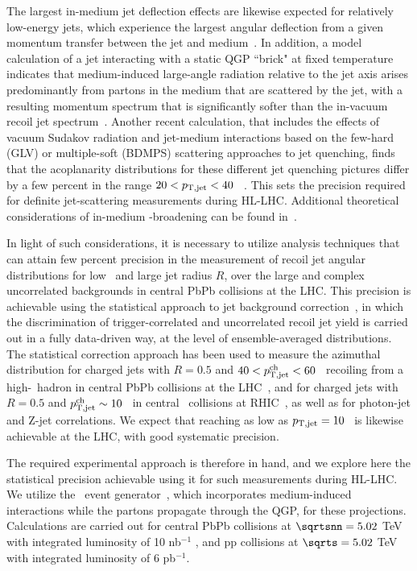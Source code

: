 The largest in-medium jet deflection effects are likewise expected for relatively low-energy jets, which experience the largest angular deflection from a given momentum transfer between the jet and medium~\cite{DEramo:2018eoy,Gyulassy:2018qhr}. In addition, a model calculation of a jet interacting with a static QGP ``brick" at fixed temperature indicates that medium-induced large-angle radiation relative to the jet axis arises predominantly from partons in the medium that are scattered by the jet, with a resulting momentum spectrum that is significantly softer than the in-vacuum recoil jet spectrum~\cite{DEramo:2018eoy}. Another recent calculation, that includes the effects of vacuum Sudakov radiation and jet-medium interactions based on the few-hard (GLV) or multiple-soft (BDMPS) scattering approaches to jet quenching, finds that the acoplanarity distributions for these different jet quenching pictures differ by a few percent in the range $20<p_{\mathrm{T,jet}}<40$ \gevc~\cite{Gyulassy:2018qhr}. This sets the precision required for definite jet-scattering measurements during HL-LHC. Additional theoretical considerations of in-medium \pT-broadening can be found in~\cite{Zakharov:2018rst,Ghiglieri:2018ltw}.

In light of such considerations, it is necessary to utilize analysis techniques that can attain few percent precision in the measurement of recoil jet angular distributions for low \ptjet\ and large jet radius $R$, over the large and complex uncorrelated backgrounds in central PbPb collisions at the LHC. This precision is achievable using the statistical approach to jet background correction~\cite{Adam:2015doa,Adamczyk:2017yhe,Sirunyan:2017jic,Sirunyan:2017qhf}, in which the discrimination of trigger-correlated and uncorrelated recoil jet yield is carried out in a fully data-driven way, at the level of ensemble-averaged distributions. The statistical correction approach has been used to measure the azimuthal distribution for charged jets with $R=0.5$ and $40<p_{\mathrm{T,jet}}^{\mathrm{ch}}<60$ \gevc\ recoiling from a high-\pt\ hadron in central PbPb collisions at the LHC~\cite{Adam:2015doa}, and for charged jets with $R=0.5$ and $p_{\mathrm{T,jet}}^{\mathrm{ch}}\sim10$ \gevc\ in central \AuAu\ collisions at RHIC~\cite{Adamczyk:2017yhe}, as well as for photon-jet and Z-jet correlations. We expect that reaching as low as $p_{\mathrm{T,jet}}=10$ \gevc\ is likewise achievable at the LHC, with good systematic precision. 

The required experimental approach is therefore in hand, and we explore here the statistical precision achievable using it for such measurements during HL-LHC. 
We utilize the \jewel\ event generator~\cite{Zapp:2013vla}, which incorporates medium-induced interactions while the partons propagate through the QGP, for these projections. Calculations are carried out for central PbPb collisions at $\sqrtsnn=5.02$ TeV with integrated luminosity of 10 nb$^{-1}$ , and pp collisions at $\sqrts=5.02$ TeV with integrated luminosity of 6 pb$^{-1}$. 

